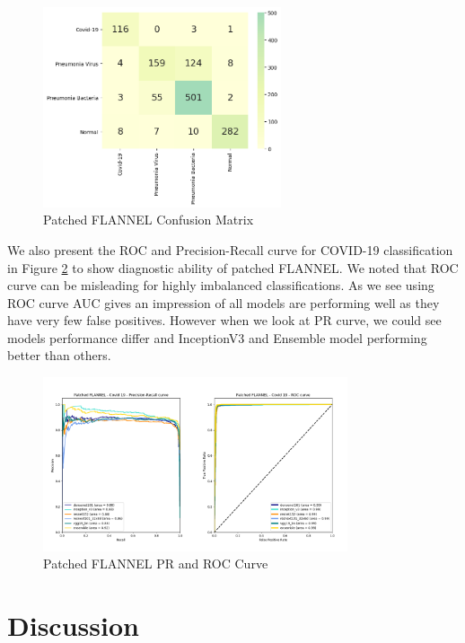 \documentclass{sigkddExp}
\begin{document}
\begin{figure}[h]
    \centering
    \includegraphics[width=7cm]{../doc/images/patched_flannel_cf.png}
    \caption{Patched FLANNEL Confusion Matrix}
    \label{fig:p_cf}
\end{figure}


We also present the ROC and Precision-Recall curve for COVID-19 classification
in Figure \ref{fig:pf_roccurve} to show diagnostic ability of patched FLANNEL.
We noted that ROC curve can be misleading for highly imbalanced classifications.
As we see using ROC curve AUC gives an impression of all models are performing
well as they have very few false positives. However when we look at PR curve, we
could see models performance differ and InceptionV3 and Ensemble model
performing better than others.


\begin{figure}[h]
    \centering
    \includegraphics[width=0.8\textwidth]{../doc/images/patched_flannel_covid_19_plot_curve.png}
    \caption{Patched FLANNEL PR and ROC Curve}
    \label{fig:pf_roccurve}
\end{figure}


\section{Discussion}
\end{document}
